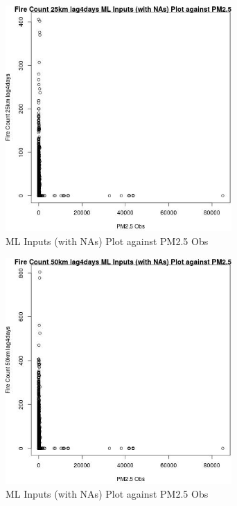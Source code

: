 \begin{figure} 
\centering  
\includegraphics[width=0.77\textwidth]{Code_Outputs/Report_ML_input_PM25_Step4_part_f_de_duplicated_aves_prioritize_24hr_obswNAs_Fire_Count_25km_lag4daysvPM25_Obs.jpg} 
\caption{\label{fig:Report_ML_input_PM25_Step4_part_f_de_duplicated_aves_prioritize_24hr_obswNAsFire_Count_25km_lag4daysvPM25_Obs}ML Inputs (with NAs) Plot against PM2.5 Obs} 
\end{figure} 
 

\begin{figure} 
\centering  
\includegraphics[width=0.77\textwidth]{Code_Outputs/Report_ML_input_PM25_Step4_part_f_de_duplicated_aves_prioritize_24hr_obswNAs_Fire_Count_50km_lag4daysvPM25_Obs.jpg} 
\caption{\label{fig:Report_ML_input_PM25_Step4_part_f_de_duplicated_aves_prioritize_24hr_obswNAsFire_Count_50km_lag4daysvPM25_Obs}ML Inputs (with NAs) Plot against PM2.5 Obs} 
\end{figure} 
 

